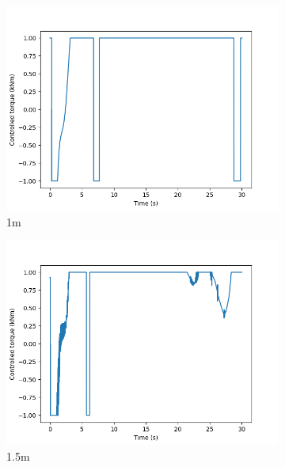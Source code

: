 \documentclass[class=article, crop=false]{standalone}
\begin{document}
\begin{figure}
\begin{subfigure}[b]{0.48\textwidth}
        \includegraphics{scenario1/rov-100m/1.0m/usv_torque}
        \caption{1m}
        \label{}
    \end{subfigure}
    \hfill
    \begin{subfigure}[b]{0.48\textwidth}
        \centering
        \includegraphics{scenario1/rov-100m/1.5m/usv_torque}
        \caption{1.5m}
        \label{}
    \end{subfigure}
    \vfill
    \begin{subfigure}[b]{0.48\textwidth}
        \centering

\end{subfigure}
\end{figure}
\end{document}
